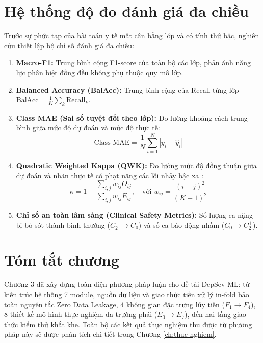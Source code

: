 \section{Hệ thống độ đo đánh giá đa chiều}
\label{sec:he-thong-do-do}

Trước sự phức tạp của bài toán y tế mất cân bằng lớp và có tính thứ bậc, nghiên cứu thiết lập bộ chỉ số đánh giá đa chiều:
\begin{enumerate}
    \item \textbf{Macro-F1:} Trung bình cộng F1-score của toàn bộ các lớp, phản ánh năng lực phân biệt đồng đều không phụ thuộc quy mô lớp.
    \item \textbf{Balanced Accuracy (BalAcc):} Trung bình cộng của Recall từng lớp $\text{BalAcc} = \frac{1}{K}\sum_k \text{Recall}_k$.
    \item \textbf{Class MAE (Sai số tuyệt đối theo lớp):} Đo lường khoảng cách trung bình giữa mức độ dự đoán và mức độ thực tế:
    \begin{equation}
        \text{Class MAE} = \frac{1}{N} \sum_{i=1}^N |y_i - \hat{y}_i|
    \end{equation}
    \item \textbf{Quadratic Weighted Kappa (QWK):} Đo lường mức độ đồng thuận giữa dự đoán và nhãn thực tế có phạt nặng các lỗi nhảy bậc xa \cite{cohen1968weighted}:
    \begin{equation}
        \kappa = 1 - \frac{\sum_{i,j} w_{ij} O_{ij}}{\sum_{i,j} w_{ij} E_{ij}}, \quad \text{với } w_{ij} = \frac{(i - j)^2}{(K - 1)^2}
    \end{equation}
    \item \textbf{Chỉ số an toàn lâm sàng (Clinical Safety Metrics):} Số lượng ca nặng bị bỏ sót thành bình thường ($C_2^+ \to C_0$) và số ca báo động nhầm ($C_0 \to C_2^+$).
\end{enumerate}

\section{Tóm tắt chương}
\label{sec:tom-tat-chuong-3}

Chương 3 đã xây dựng toàn diện phương pháp luận cho đề tài DepSev-ML: từ kiến trúc hệ thống 7 module, nguồn dữ liệu và giao thức tiền xử lý in-fold bảo toàn nguyên tắc Zero Data Leakage, 4 không gian đặc trưng lũy tiến ($F_1 \to F_4$), 8 thiết kế mô hình thực nghiệm đa trường phái ($E_0 \to E_7$), đến hai tầng giao thức kiểm thử khắt khe. Toàn bộ các kết quả thực nghiệm thu được từ phương pháp này sẽ được phân tích chi tiết trong Chương \ref{ch:thuc-nghiem}.
